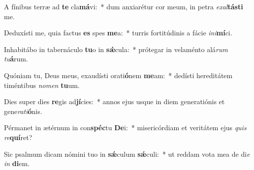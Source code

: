 \item A fínibus terræ ad \textbf{te} cla\textbf{má}vi:~* dum anxiarétur cor meum, in petra \textit{ex}\textit{al}\textbf{tás}\textbf{ti} me.
\item Deduxísti me, quia factus \textbf{es} spes \textbf{me}a:~* turris fortitúdinis a fácie \textit{in}\textit{i}\textbf{mí}ci.
\item Inhabitábo in tabernáculo \textbf{tu}o in \textbf{sǽ}cula:~* prótegar in velaménto alá\textit{rum} \textit{tu}\textbf{á}rum.
\item Quóniam tu, Deus meus, exaudísti orati\textbf{ó}nem \textbf{me}am:~* dedísti hereditátem timéntibus \textit{no}\textit{men} \textbf{tu}um.
\item Dies super dies \textbf{re}gis ad\textbf{jí}cies:~* annos ejus usque in diem generatiónis et gene\textit{ra}\textit{ti}\textbf{ó}nis.
\item Pérmanet in ætérnum in con\textbf{spéc}tu \textbf{De}i:~* misericórdiam et veritátem ejus \textit{quis} \textit{re}\textbf{quí}ret?
\item Sic psalmum dicam nómini tuo in \textbf{sǽ}culum \textbf{sǽ}culi:~* ut reddam vota mea de di\textit{e} \textit{in} \textbf{di}em.
